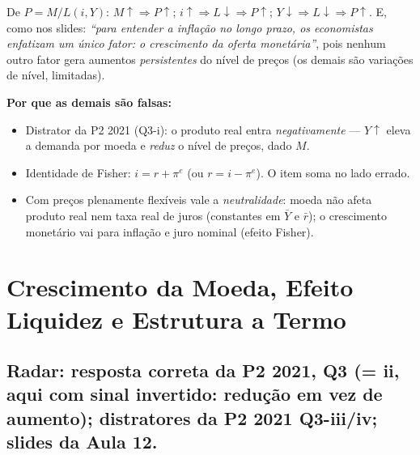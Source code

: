 \documentclass[12pt, a4paper]{article}
\begin{document}
\begin{correctbox}[title={Resposta correta: d)}]
De $P = M/L(i,Y)$: $M\uparrow \Rightarrow P\uparrow$;
$i\uparrow \Rightarrow L\downarrow \Rightarrow P\uparrow$;
$Y\downarrow \Rightarrow L\downarrow \Rightarrow P\uparrow$. E, como nos
slides: \emph{``para entender a inflação no longo prazo, os economistas
enfatizam um único fator: o crescimento da oferta monetária''}, pois nenhum
outro fator gera aumentos \emph{persistentes} do nível de preços (os demais são
variações de nível, limitadas). \checkmark

\textbf{Por que as demais são falsas:}
\begin{itemize}[leftmargin=*]
\item[a)] Distrator da P2 2021 (Q3-i): o produto real entra
\emph{negativamente} --- $Y\uparrow$ eleva a demanda por moeda e \emph{reduz} o
nível de preços, dado $M$.
\item[b)] Identidade de Fisher: $i = r + \pi^e$ (ou $r = i - \pi^e$). O item
soma no lado errado.
\item[c)] Com preços plenamente flexíveis vale a \emph{neutralidade}: moeda não
afeta produto real nem taxa real de juros (constantes em $\bar{Y}$ e
$\bar{r}$); o crescimento monetário vai para inflação e juro nominal
(efeito Fisher).
\end{itemize}
\end{correctbox}

\section{Crescimento da Moeda, Efeito Liquidez e Estrutura a Termo}

\subsection{Radar: resposta correta da P2 2021, Q3 (= ii, aqui com sinal invertido: redução em vez de aumento); distratores da P2 2021 Q3-iii/iv; slides da Aula 12.}
\end{document}

